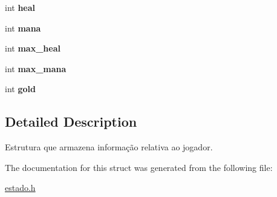 \begin{DoxyCompactItemize}
\item 
int {\bfseries heal}\hypertarget{structinfojog_a50ada24989fd911c44b58db335c8ac13}{}\label{structinfojog_a50ada24989fd911c44b58db335c8ac13}

\item 
int {\bfseries mana}\hypertarget{structinfojog_a78cd28e8fd84dafff60f3e0aecdda62f}{}\label{structinfojog_a78cd28e8fd84dafff60f3e0aecdda62f}

\item 
int {\bfseries max\+\_\+heal}\hypertarget{structinfojog_abf2c3b7b5981e2030ee3e32dd8e63290}{}\label{structinfojog_abf2c3b7b5981e2030ee3e32dd8e63290}

\item 
int {\bfseries max\+\_\+mana}\hypertarget{structinfojog_a414ad05cb2382dcb8f63027fbfc08f9b}{}\label{structinfojog_a414ad05cb2382dcb8f63027fbfc08f9b}

\item 
int {\bfseries gold}\hypertarget{structinfojog_a0969d3cb84063a53d976a29094b2ba6d}{}\label{structinfojog_a0969d3cb84063a53d976a29094b2ba6d}

\end{DoxyCompactItemize}


\subsection{Detailed Description}
Estrutura que armazena informação relativa ao jogador. 

The documentation for this struct was generated from the following file\+:\begin{DoxyCompactItemize}
\item 
\hyperlink{estado_8h}{estado.\+h}\end{DoxyCompactItemize}
